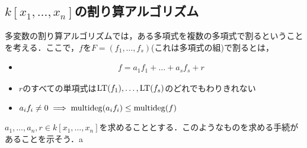 \subsection{$k[x_1,\dots,x_n]$の割り算アルゴリズム}
多変数の割り算アルゴリズムでは，ある多項式を複数の多項式で割るということを考える．ここで，$f$を$F=(f_1,\dots,f_s)$(これは多項式の組)で割るとは，
\begin{itemize}
 \item
\begin{align}
 f = a_1 f_1 + \dots + a_s f_s + r
\end{align}
 \item
$r$のすべての単項式は${\rm LT}(f_1),\dots,{\rm LT}(f_s)$のどれでもわりきれない
 \item $a_i f_i \neq 0 \implies \mathrm{multideg}(a_i f_i) \le \mathrm{multideg}(f)$
\end{itemize}
$a_1,\dots,a_n,r \in k[x_1,\dots,x_n]$を求めることとする．このようなものを求める手続があることを示そう．a

